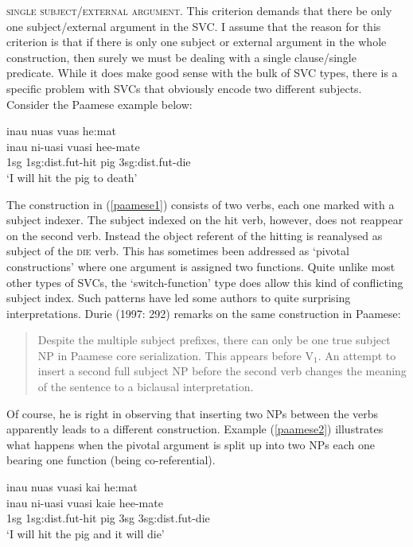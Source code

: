 \textsc{single subject/external argument}. This criterion demands that there be only one subject/external argument in the SVC. I assume that the reason for this criterion is that if there is only one subject or external argument in the whole construction, then surely we must be dealing with a single clause/single predicate. While it does make good sense with the bulk of SVC types, there is a specific problem with SVCs that obviously encode two different subjects. Consider the Paamese example below:

\ea \label{paamese1}
\gll inau nuas vuas he:mat \\
inau ni-uasi vuasi hee-mate \\
\glc \acs{1}\acs{sg} \acs{1}\acs{sg}:\acs{dist}.\acs{fut}-hit pig \acs{3}\acs{sg}:\acs{dist}.\acs{fut}-die \\
\glft `I will hit the pig to death' \\ 
\z
\xe

The construction in (\ref{paamese1}) consists of two verbs, each one marked with a subject indexer. The subject indexed on the hit verb, however, does not reappear on the second verb. Instead the object referent of the hitting is reanalysed as subject of the \textsc{die} verb. This has sometimes been addressed as `pivotal constructions' where one argument is assigned two functions. Quite unlike most other types of SVCs, the `switch-function' type does allow this kind of conflicting subject index. Such patterns have led some authors to quite surprising interpretations. Durie (1997: 292) remarks on the same construction in Paamese: \begin{quote}Despite the multiple subject prefixes, there can only be one true subject NP in Paamese core serialization. This appears before V$_1$. An attempt to insert a second full subject NP before the second verb changes the meaning of the sentence to a biclausal interpretation.\end{quote}

Of course, he is right in observing that inserting two NPs between the verbs apparently leads to a different construction. Example (\ref{paamese2}) illustrates what happens when the pivotal argument is split up into two NPs each one bearing one function (being co-referential).

\ea \label{paamese2}
\gll inau nuas vuasi kai he:mat \\
inau ni-uasi vuasi kaie hee-mate \\
\glc \acs{1}\acs{sg} \acs{1}\acs{sg}:\acs{dist}.\acs{fut}-hit pig \acs{3}\acs{sg} \acs{3}\acs{sg}:\acs{dist}.\acs{fut}-die \\
\glft `I will hit the pig and it will die' \\ 
\z
\xe

